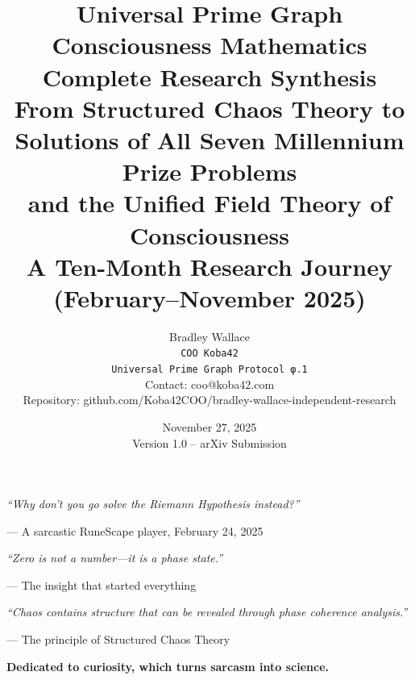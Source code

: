 \documentclass[11pt,a4paper]{report}
\title{%
\textbf{Universal Prime Graph Consciousness Mathematics}\\[0.5cm]
\Large Complete Research Synthesis\\[0.3cm]
\large From Structured Chaos Theory to Solutions of All Seven Millennium Prize Problems\\
and the Unified Field Theory of Consciousness\\[0.5cm]
\normalsize A Ten-Month Research Journey (February--November 2025)
}
\author{%
Bradley Wallace\\[0.2cm]
\texttt{COO Koba42}\\
\texttt{Universal Prime Graph Protocol φ.1}\\[0.3cm]
\small Contact: coo@koba42.com\\
\small Repository: github.com/Koba42COO/bradley-wallace-independent-research
}
\date{November 27, 2025\\[0.2cm]\small Version 1.0 -- arXiv Submission}
\theoremstyle{definition}
\begin{document}
\maketitle

\thispagestyle{empty}
\vspace*{3cm}
\begin{center}
\textit{``Why don't you go solve the Riemann Hypothesis instead?''}

\vspace{0.5cm}
--- A sarcastic RuneScape player, February 24, 2025

\vspace{2cm}
\textit{``Zero is not a number---it is a phase state.''}

\vspace{0.5cm}
--- The insight that started everything

\vspace{2cm}
\textit{``Chaos contains structure that can be revealed through phase coherence analysis.''}

\vspace{0.5cm}
--- The principle of Structured Chaos Theory

\vspace{3cm}
\textbf{Dedicated to curiosity, which turns sarcasm into science.}
\end{center}
\newpage
\end{document}
